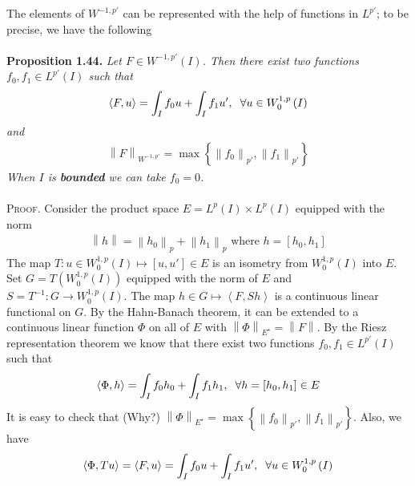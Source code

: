 \documentclass[a4paper,oneside]{article}
\numberwithin{equation}{section}
\begin{document}
The elements of $W^{-1,p'}$ can be represented with the help of functions in $L^{p'}$; to be precise, we have the following\\
\\
\textbf{Proposition 1.44.} \textit{Let $F\in W^{-1,p'}\left(I\right)$. Then there exist two functions $f_0,f_1\in L^{p'}\left(I\right)$ such that}
\begin{align}
\left\langle {F,u} \right\rangle  = \int_I {{f_0}u}  + \int_I {{f_1}u'} ,\hspace{0.2cm}\forall u \in W_0^{1,p}\left( I \right)
\end{align}
\textit{and}
\begin{align}
{\left\| F \right\|_{{W^{ - 1,p'}}}} = \max \left\{ {{{\left\| {{f_0}} \right\|}_{p'}},{{\left\| {{f_1}} \right\|}_{p'}}} \right\}
\end{align}
\textit{When $I$ is \textbf{bounded} we can take $f_0=0$.}\\
\\
\textsc{Proof.} Consider the product space $E=L^p\left(I\right)\times L^p\left(I\right)$ equipped with the norm
\begin{align}
\left\| h \right\| = {\left\| {{h_0}} \right\|_p} + {\left\| {{h_1}} \right\|_p}\mbox{ where } h = \left[ {{h_0},{h_1}} \right]
\end{align}
The map $T:u \in W_0^{1,p}\left( I \right) \mapsto \left[ {u,u'} \right] \in E$ is an isometry from $W_0^{1,p}\left(I\right)$ into $E$. Set $G = T\left( {W_0^{1,p}\left( I \right)} \right)$ equipped with the norm of $E$ and $S = {T^{ - 1}}:G \to W_0^{1,p}\left( I \right)$. The map $h \in G \mapsto \left\langle {F,Sh} \right\rangle $ is a continuous linear functional on $G$. By the Hahn-Banach theorem, it can be extended to a continuous linear function $\Phi $ on all of $E$ with ${\left\| \Phi  \right\|_{{E^{\star}}}} = \left\| F \right\|$. By the Riesz representation theorem we know that there exist two functions $f_0,f_1\in L^{p'}\left(I\right)$ such that
\begin{align}
\left\langle {\Phi ,h} \right\rangle  = \int_I {{f_0}{h_0}}  + \int_I {{f_1}{h_1}} ,\hspace{0.2cm}\forall h = \left[ {{h_0},{h_1}} \right] \in E
\end{align}
It is easy to check that (Why?) ${\left\| \Phi  \right\|_{{E^{\star}}}} = \max \left\{ {{{\left\| {{f_0}} \right\|}_{p'}},{{\left\| {{f_1}} \right\|}_{p'}}} \right\}$. Also, we have
\begin{align}
\left\langle {\Phi ,Tu} \right\rangle  = \left\langle {F,u} \right\rangle  = \int_I {{f_0}u}  + \int_I {{f_1}u'} ,\hspace{0.2cm}\forall u \in W_0^{1,p}\left( I \right)
\end{align}
\end{document}
